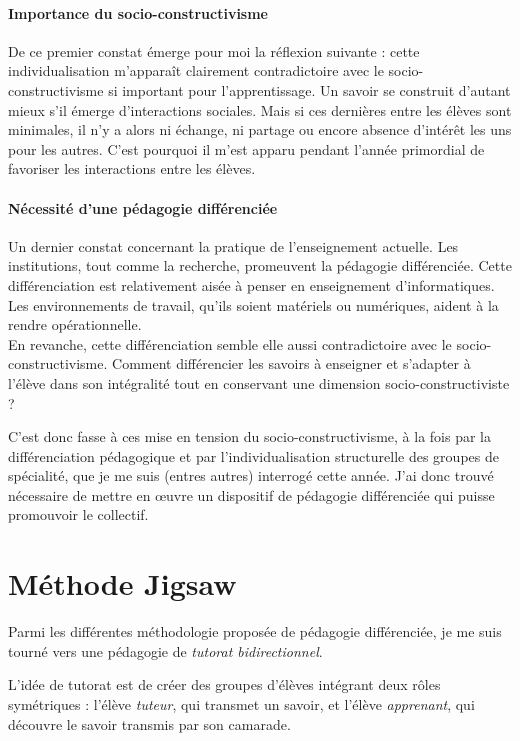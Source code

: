 \paragraph{Importance du socio-constructivisme} De ce premier constat émerge pour moi la réflexion suivante : cette individualisation m'apparaît clairement contradictoire avec le socio-constructivisme si important pour l'apprentissage. Un savoir se construit d'autant mieux s'il émerge d'interactions sociales. Mais si ces dernières entre les élèves sont minimales, il n'y a alors ni échange, ni partage ou encore absence d'intérêt les uns pour les autres. C'est pourquoi il m'est apparu pendant l'année primordial de favoriser les interactions entre les élèves.


\paragraph{Nécessité d'une pédagogie différenciée} Un dernier constat concernant la pratique de l'enseignement actuelle. Les institutions, tout comme la recherche, promeuvent la pédagogie différenciée. Cette différenciation est relativement aisée à penser en enseignement d'informatiques. Les environnements de travail, qu'ils soient matériels ou numériques, aident à la rendre opérationnelle.
\\
En revanche, cette différenciation semble elle aussi contradictoire avec le socio-constructivisme. Comment différencier les savoirs à enseigner et s'adapter à l'élève dans son intégralité tout en conservant une dimension socio-constructiviste ?

C'est donc fasse à ces mise en tension du socio-constructivisme, à la fois par la différenciation pédagogique et par l'individualisation structurelle des groupes de spécialité, que je me suis (entres autres) interrogé cette année. J'ai donc trouvé nécessaire de mettre en œuvre un dispositif de pédagogie différenciée qui puisse promouvoir le collectif.


\section{Méthode Jigsaw}

Parmi les différentes méthodologie proposée de pédagogie différenciée, je me suis tourné vers une pédagogie de \emph{tutorat bidirectionnel}. 

L'idée de tutorat est de créer des groupes d'élèves intégrant deux rôles symétriques : l'élève \emph{tuteur}, qui transmet un savoir, et l'élève \emph{apprenant}, qui découvre le savoir transmis par son camarade.

